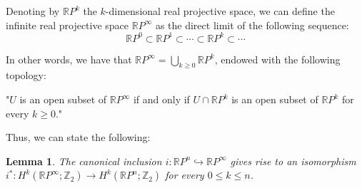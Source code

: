 \documentclass[12pt,oneside]{book}
\newtheorem{lem}    {Lemma}[chapter]
\newcommand{\ds}{\displaystyle}
\newcommand{\RP}{\mathbb{R}P}
\newcommand{\Z}{\mathbb{Z}}
\begin{document}
    Denoting by $\RP^{k}$ the $k$-dimensional real projective space, we can define the infinite real 
    projective space $\RP^{\infty}$ as the direct limit of the following sequence:
    $$ \RP^{0} \subset \RP^{1} \subset \cdots \subset \RP^{k} \subset \cdots $$
    
    In other words, we have that $\RP^{\infty}=\ds\bigcup_{k\geq 0}\RP^{k}$, endowed with the following topology:
    
    \begin{center}
        "$U$ is an open subset of $\RP^{\infty}$ if and only if $U\cap\RP^{k}$ is an open subset of $\RP^{k}$ for every $k\geq 0$."
    \end{center}
    
    Thus, we can state the following:
    
    \begin{lem}\label{iso_proj}
        The canonical inclusion $i:\RP^{n}\hookrightarrow \RP^{\infty}$ gives rise to an isomorphism 
        $i^{*}:H^{k}(\RP^{\infty};\Z_{2})\to H^{k}(\RP^{n};\Z_{2})$ for every $0\leq k\leq n$.
    \end{lem}
    
\end{document}
